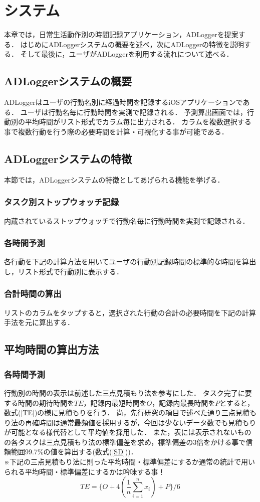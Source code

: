 \chapter{システム}
本章では，日常生活動作別の時間記録アプリケーション，ADLoggerを提案する．
はじめにADLoggerシステムの概要を述べ，次にADLoggerの特徴を説明する．
そして最後に，ユーザがADLoggerを利用する流れについて述べる．

\section{ADLoggerシステムの概要}
ADLoggerはユーザの行動名別に経過時間を記録するiOSアプリケーションである．
ユーザは行動名毎に行動時間を実測で記録される．
予測算出画面では，行動別の平均時間がリスト形式でカラム毎に出力される．
カラムを複数選択する事で複数行動を行う際の必要時間を計算・可視化する事が可能である．

\section{ADLoggerシステムの特徴}
本節では，ADLoggerシステムの特徴としてあげられる機能を挙げる．
\subsection{タスク別ストップウォッチ記録}
内蔵されているストップウォッチで行動名毎に行動時間を実測で記録される．
\subsection{各時間予測}
各行動を下記の計算方法を用いてユーザの行動別記録時間の標準的な時間を算出し，リスト形式で行動別に表示する．
\subsection{合計時間の算出}
リストのカラムをタップすると，選択された行動の合計の必要時間を下記の計算手法を元に算出する．

\section{平均時間の算出方法}
\subsection{各時間予測}
行動別の時間の表示は前述した三点見積もり法を参考にした．
タスク完了に要する時間の期待時間を$TE$，記録内最短時間を$O$，記録内最長時間を$P$とすると，数式(\ref{TE})の様に見積もりを行う．
尚，先行研究の項目で述べた通り三点見積もり法の再確時間は通常最頻値を採用するが，今回は少ないデータ数でも見積もりが可能となる様代替として平均値を採用した．
また，表には表示されないものの各タスクは三点見積もり法の標準偏差を求め，標準偏差の3倍をかける事で信頼範囲99.7\%の値を算出する(数式(\ref{SD}))．
\\※下記の三点見積もり法に則った平均時間・標準偏差にするか通常の統計で用いられる平均時間・標準偏差にするかは吟味する事！
\begin{equation}
\label{TE}
TE=\{ O + 4(\frac{1}{n}\displaystyle\sum_{i=1}^{n}x_{i}) + P\}/6
\end{equation}

